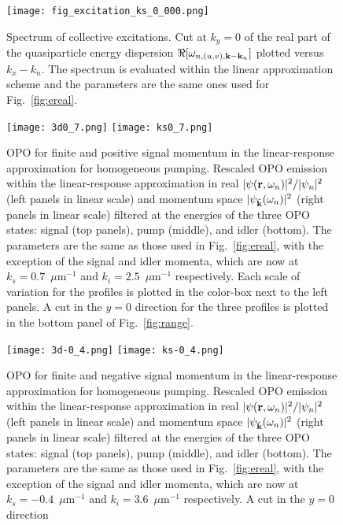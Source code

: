 \begin{subappendices}
%
\begin{figure}[tb]\centering
\texttt{[image: fig\_excitation\_ks\_0\_000.png]}
\caption{Spectrum of collective excitations. Cut at $k_y=0$ of the
  real part of the quasiparticle energy dispersion
  $\Re [\omega_{n,(u,v),\mathbf{k}-\mathbf{k}_n}]$ plotted versus $k_x -
  k_n$. The spectrum is evaluated within the linear approximation
  scheme and the parameters are the same ones used for
  Fig.~\ref{fig:ereal}.}
\label{fig:bogol}
\end{figure}
%
%
\begin{figure}[tb]
\centering
\texttt{[image: 3d0\_7.png]}
\texttt{[image: ks0\_7.png]}
\caption{OPO for finite and positive signal momentum in the
  linear-response approximation for homogeneous pumping. Rescaled OPO
  emission within the linear-response approximation in real
  $|\psi (\mathbf{r},\omega_n)|^2/|\psi_n|^2$ (left panels in linear
  scale) and momentum space $|\psi_{\tilde{\mathbf{k}}} (\omega_n)|^2$
  (right panels in linear scale) filtered at the energies of the three
  OPO states: signal (top panels), pump (middle), and idler
  (bottom). The parameters are the same as those used in
  Fig.~\ref{fig:ereal}, with the exception of the signal and idler
  momenta, which are now at $k_s = 0.7$~$\mu$m$^{-1}$ and
  $k_i = 2.5$~$\mu$m$^{-1}$ respectively. Each scale of variation for
  the profiles is plotted in the color-box next to the left panels. A
  cut in the $y=0$ direction for the three profiles is plotted in the
  bottom panel of Fig.~\ref{fig:range}.}
\label{fig:ksp07}
\end{figure}
%
%
\begin{figure}[tb]
\centering
\texttt{[image: 3d-0\_4.png]}
\texttt{[image: ks-0\_4.png]}
\caption{OPO for finite and negative signal momentum in the
  linear-response approximation for homogeneous pumping. Rescaled OPO
  emission within the linear-response approximation in real
  $|\psi (\mathbf{r},\omega_n)|^2/|\psi_n|^2$ (left panels in linear
  scale) and momentum space $|\psi_{\tilde{\mathbf{k}}} (\omega_n)|^2$
  (right panels in linear scale) filtered at the energies of the three
  OPO states: signal (top panels), pump (middle), and idler
  (bottom). The parameters are the same as those used in
  Fig.~\ref{fig:ereal}, with the exception of the signal and idler
  momenta, which are now at $k_s = -0.4$~$\mu$m$^{-1}$ and
  $k_i = 3.6$~$\mu$m$^{-1}$ respectively. A cut in the $y=0$ direction
}
\end{figure}
\end{subappendices}
